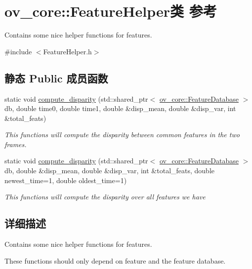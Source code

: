 \hypertarget{classov__core_1_1FeatureHelper}{}\section{ov\+\_\+core\+:\+:Feature\+Helper类 参考}
\label{classov__core_1_1FeatureHelper}


Contains some nice helper functions for features.  




{\ttfamily \#include $<$Feature\+Helper.\+h$>$}

\subsection*{静态 Public 成员函数}
\begin{DoxyCompactItemize}
\item 
static void \hyperlink{classov__core_1_1FeatureHelper_a1371c7d11c6d74693f7cec9deea2afcd}{compute\+\_\+disparity} (std\+::shared\+\_\+ptr$<$ \hyperlink{classov__core_1_1FeatureDatabase}{ov\+\_\+core\+::\+Feature\+Database} $>$ db, double time0, double time1, double \&disp\+\_\+mean, double \&disp\+\_\+var, int \&total\+\_\+feats)
\begin{DoxyCompactList}\small\item\em This functions will compute the disparity between common features in the two frames. \end{DoxyCompactList}\item 
static void \hyperlink{classov__core_1_1FeatureHelper_aef3bc04d256c42e04fce2a62e30c3ef0}{compute\+\_\+disparity} (std\+::shared\+\_\+ptr$<$ \hyperlink{classov__core_1_1FeatureDatabase}{ov\+\_\+core\+::\+Feature\+Database} $>$ db, double \&disp\+\_\+mean, double \&disp\+\_\+var, int \&total\+\_\+feats, double newest\+\_\+time=1, double oldest\+\_\+time=1)
\begin{DoxyCompactList}\small\item\em This functions will compute the disparity over all features we have \end{DoxyCompactList}\end{DoxyCompactItemize}


\subsection{详细描述}
Contains some nice helper functions for features. 

These functions should only depend on feature and the feature database. 

